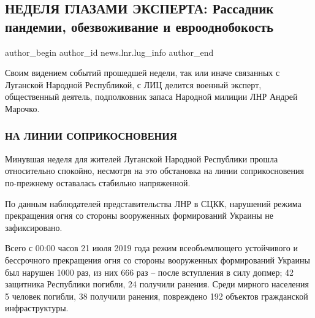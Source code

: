  
 
 
 
 
\subsection{НЕДЕЛЯ ГЛАЗАМИ ЭКСПЕРТА: Рассадник пандемии, обезвоживание и еврооднобокость}
\label{sec:09_01_2022.stz.news.lnr.lug_info.1.nedelja}

\ifcmt
 author_begin
   author_id news.lnr.lug_info
 author_end
\fi

\begin{zznagolos}
Своим видением событий прошедшей недели, так или иначе связанных с Луганской
Народной Республикой, с ЛИЦ делится военный эксперт, общественный деятель,
подполковник запаса Народной милиции ЛНР Андрей Марочко.	
\end{zznagolos}


\subsubsection{НА ЛИНИИ СОПРИКОСНОВЕНИЯ}

Минувшая неделя для жителей Луганской Народной Республики прошла относительно
спокойно, несмотря на это обстановка на линии соприкосновения по-прежнему
оставалась стабильно напряженной.

По данным наблюдателей представительства ЛНР в СЦКК, нарушений режима
прекращения огня со стороны вооруженных формирований Украины не зафиксировано.

Всего с 00:00 часов 21 июля 2019 года режим всеобъемлющего устойчивого и
бессрочного прекращения огня со стороны вооруженных формирований Украины был
нарушен 1000 раз, из них 666 раз – после вступления в силу допмер; 42 защитника
Республики погибли, 24 получили ранения. Среди мирного населения 5 человек
погибли, 38 получили ранения, повреждено 192 объектов гражданской
инфраструктуры.

